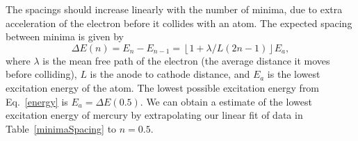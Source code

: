 \documentclass[prb,preprint]{revtex4-1}
\begin{document}
The spacings should increase linearly with the number of minima, due to extra acceleration of the electron before it collides with an atom. The expected spacing between minima is given by 
\begin{equation}\label{energy}\Delta E(n)=E_n-E_{n-1}=\left\lfloor 1+\lambda/L(2n-1)\right\rfloor E_a,\end{equation}
where $\lambda$ is the mean free path of the electron (the average distance it moves before colliding), $L$ is the anode to cathode distance, and $E_a$ is the lowest excitation energy of the atom. The lowest possible excitation energy from Eq.~\ref{energy} is $E_a=\Delta E(0.5)$. \cite{new}
We can obtain a estimate of the lowest excitation energy of mercury by extrapolating our linear fit of data in Table~\ref{minimaSpacing} to $n=0.5$. 
\end{document}
